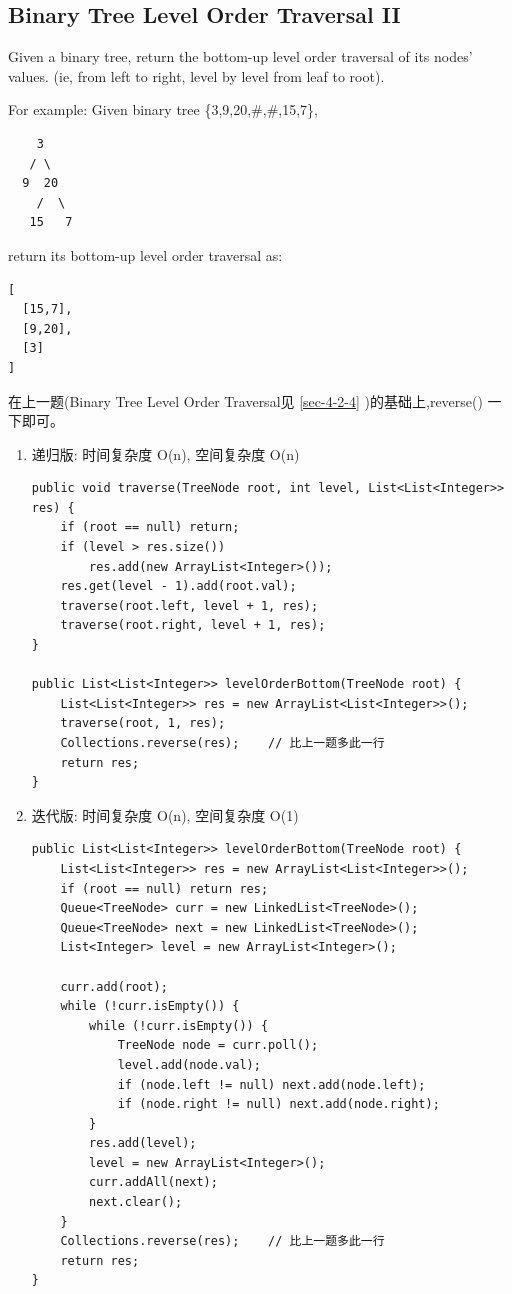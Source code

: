 \documentclass[12pt]{book}
\begin{document}
\subsection{Binary Tree Level Order Traversal II}
\label{sec-4-2-5}
Given a binary tree, return the bottom-up level order traversal of its nodes' values. (ie, from left to right, level by level from leaf to root).

For example:
Given binary tree \{3,9,20,\#,\#,15,7\},
\lstset{language=java,label= ,caption= ,numbers=none}
\begin{lstlisting}
    3
   / \
  9  20
    /  \
   15   7
\end{lstlisting}
return its bottom-up level order traversal as:
\lstset{language=java,label= ,caption= ,numbers=none}
\begin{lstlisting}
[
  [15,7],
  [9,20],
  [3]
]
\end{lstlisting}

在上一题(Binary Tree Level Order Traversal见 \ref{sec-4-2-4} )的基础上,reverse() 一下即可。

\begin{enumerate}
\item 递归版: 时间复杂度 O(n), 空间复杂度 O(n)
\label{sec-4-2-5-1}


\lstset{language=java,label= ,caption= ,numbers=none}
\begin{lstlisting}
public void traverse(TreeNode root, int level, List<List<Integer>> res) {
    if (root == null) return;
    if (level > res.size())
        res.add(new ArrayList<Integer>());
    res.get(level - 1).add(root.val);
    traverse(root.left, level + 1, res);
    traverse(root.right, level + 1, res);
}
        
public List<List<Integer>> levelOrderBottom(TreeNode root) {
    List<List<Integer>> res = new ArrayList<List<Integer>>();
    traverse(root, 1, res);
    Collections.reverse(res);    // 比上一题多此一行
    return res;
}
\end{lstlisting}

\item 迭代版: 时间复杂度 O(n), 空间复杂度 O(1)
\label{sec-4-2-5-2}


\lstset{language=java,label= ,caption= ,numbers=none}
\begin{lstlisting}
public List<List<Integer>> levelOrderBottom(TreeNode root) {
    List<List<Integer>> res = new ArrayList<List<Integer>>();
    if (root == null) return res;
    Queue<TreeNode> curr = new LinkedList<TreeNode>();
    Queue<TreeNode> next = new LinkedList<TreeNode>();
    List<Integer> level = new ArrayList<Integer>();

    curr.add(root);
    while (!curr.isEmpty()) {
        while (!curr.isEmpty()) {
            TreeNode node = curr.poll();
            level.add(node.val);
            if (node.left != null) next.add(node.left);
            if (node.right != null) next.add(node.right);
        }
        res.add(level);
        level = new ArrayList<Integer>();
        curr.addAll(next);
        next.clear();
    }
    Collections.reverse(res);    // 比上一题多此一行
    return res;
}
\end{lstlisting}
\end{enumerate}
\end{document}
